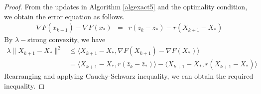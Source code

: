\begin{proof}
From the updates in Algorithm \ref{algexact5} and the optimality condition, we obtain the error equation as follows. 
\begin{eqnarray}
 \nabla F(x_{k+1}) - \nabla F(x_*) & = & r (\bar{z}_k - \bar{z}_*) - r(X_{k+1} - X_*)
\end{eqnarray}
By $\lambda-$strong convexity, we have 
\begin{equation*}
\begin{aligned}
    \lambda \|X_{k+1} - X_* \|^2 &\leq \langle X_{k+1} - X_*, \nabla F(X_{k+1}) - \nabla F(X_*) \rangle \\
    & = \langle X_{k+1} - X_*, r(\bar{z}_k - \bar{z}_* )\rangle - \langle X_{k+1} - X_*, r (X_{k+1} - X_*) \rangle 
\end{aligned} 
\end{equation*}
Rearranging and applying Cauchy-Schwarz inequality, we can obtain the required inequality. 
\end{proof}


